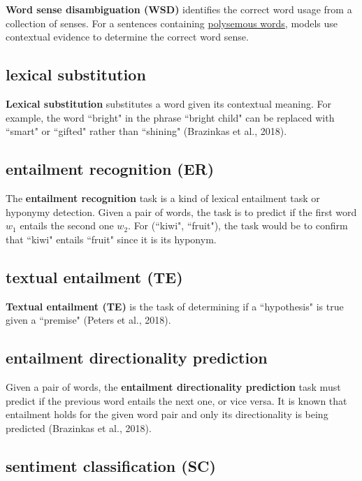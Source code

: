 \textbf{Word sense disambiguation (WSD)} identifies the correct word usage from a collection of senses. For a sentences containing \hyperref[sec:Polysemy]{polysemous words}, models use contextual evidence to determine the correct word sense. 



\subsection{lexical substitution} \label{nlptask:lexicalsubstitution}

\textbf{Lexical substitution} substitutes a word given its contextual meaning. For example, the word ``bright" in the phrase ``bright child" can be replaced with ``smart" or ``gifted" rather than ``shining" (Brazinkas et al., 2018). 

\subsection{entailment recognition (ER)} \label{nlptask:entailmentrecognition}

The \textbf{entailment recognition} task is a kind of lexical entailment task or hyponymy detection. Given a pair of words, the task is to predict if the first word $w_1$ entails the second one $w_2$. For (``kiwi", ``fruit"), the task would be to confirm that ``kiwi" entails ``fruit" since it is its hyponym. 


\subsection{textual entailment (TE)} \label{nlptask:textualentailmentTE}

\textbf{Textual entailment (TE)} is the task of determining if a ``hypothesis" is true given a ``premise" (Peters et al., 2018). 

\subsection{entailment directionality prediction} \label{nlptask:entailmentdirectionalityprediction}

Given a pair of words, the \textbf{entailment directionality prediction} task must predict if the previous word entails the next one, or vice versa. It is known that entailment holds for the given word pair and only its directionality is being predicted (Brazinkas et al., 2018). 

\subsection{sentiment classification (SC)} \label{nlptask:sentimentclassificationSC}

